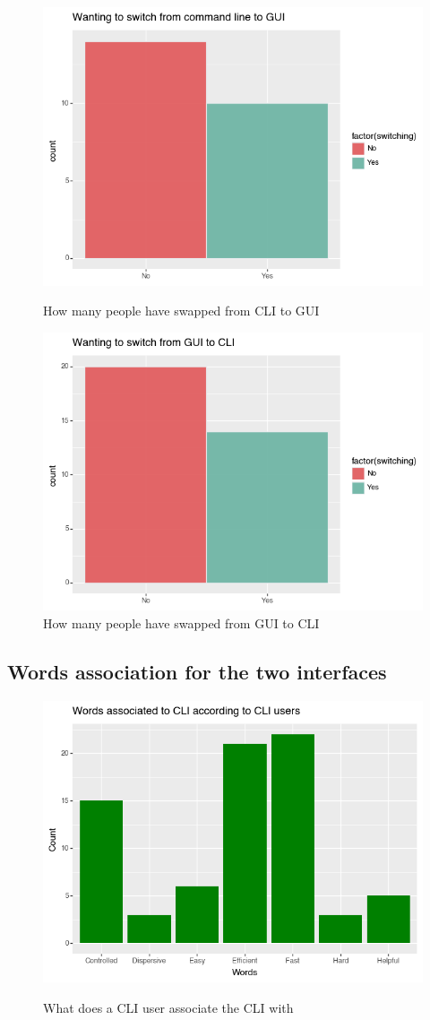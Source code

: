 \documentclass[]{report}
\begin{document}
		\begin{figure}[H]
			\centering
			\includegraphics[width=0.75\linewidth]{SwitchingCLI}\\
			\caption{How many people have swapped from CLI to GUI}
			\label{fig:13}
		\end{figure}
		
		\begin{figure}[H]
			\centering
			\includegraphics[width=0.75\linewidth]{SwitchingGUI}
			\caption{How many people have swapped from GUI to CLI}
			\label{fig: 14}
		\end{figure}
	
	\subsection{Words association for the two interfaces}
	\begin{figure}[H]
		\centering
		\includegraphics[width=0.75\linewidth]{WordsCLIFromCLI}\\
		\caption{What does a CLI user associate the CLI with}
		\label{fig: 15}
	\end{figure}
	
\end{document}
